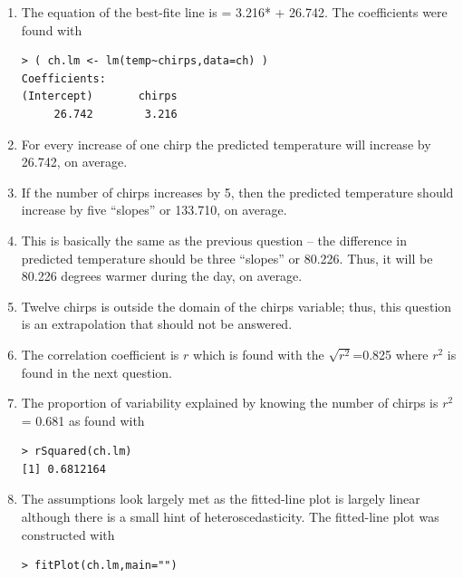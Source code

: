 \documentclass[10pt,openany]{book}\usepackage[]{graphicx}\usepackage[]{color}
\makeatletter
\newenvironment{kframe}{%
 \def\at@end@of@kframe{}%
 \ifinner\ifhmode%
  \def\at@end@of@kframe{\end{minipage}}%
  \begin{minipage}{\columnwidth}%
 \fi\fi%
 \def\FrameCommand##1{\hskip\@totalleftmargin \hskip-\fboxsep
 \colorbox{shadecolor}{##1}\hskip-\fboxsep
     \hskip-\linewidth \hskip-\@totalleftmargin \hskip\columnwidth}%
 \MakeFramed {\advance\hsize-\width
   \@totalleftmargin\z@ \linewidth\hsize
   \@setminipage}}%
 {\par\unskip\endMakeFramed%
 \at@end@of@kframe}
\newenvironment{knitrout}{}{} %
\makeatother
\begin{document}
\begin{itemize}
\begin{enumerate}
      \item The equation of the best-fite line is  = 3.216* + 26.742.  The coefficients were found with
\begin{knitrout}
\color{fgcolor}\begin{kframe}
\begin{verbatim}
> ( ch.lm <- lm(temp~chirps,data=ch) )
Coefficients:
(Intercept)       chirps  
     26.742        3.216  
\end{verbatim}
\end{kframe}
\end{knitrout}
      \item For every increase of one chirp the predicted temperature will increase by 26.742, on average.
      \item If the number of chirps increases by 5, then the predicted temperature should increase by five ``slopes'' or 133.710, on average.
      \item This is basically the same as the previous question -- the difference in predicted temperature should be three ``slopes'' or 80.226.  Thus, it will be 80.226 degrees warmer during the day, on average.
      \item Twelve chirps is outside the domain of the chirps variable; thus, this question is an extrapolation that should not be answered.
      \item The correlation coefficient is $r$ which is found with the $\sqrt{r^{2}}$=0.825 where $r^{2}$ is found in the next question.
      \item The proportion of variability explained by knowing the number of chirps is $r^{2}$ = 0.681 as found with
\begin{knitrout}
\color{fgcolor}\begin{kframe}
\begin{verbatim}
> rSquared(ch.lm)
[1] 0.6812164
\end{verbatim}
\end{kframe}
\end{knitrout}
      \item The assumptions look largely met as the fitted-line plot  is largely linear although there is a small hint of heteroscedasticity.  The fitted-line plot was constructed with
\begin{knitrout}
\color{fgcolor}\begin{kframe}
\begin{verbatim}
> fitPlot(ch.lm,main="")
\end{verbatim}
\end{kframe}\begin{figure}[hbtp]


\end{figure}
\end{knitrout}
\end{enumerate}
\end{itemize}
\end{document}
